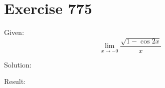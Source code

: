 \documentclass[a4paper, 10pt]{scrartcl}
\begin{document}
\section{Exercise 775}

Given:
\[
\lim_{x\to -0}{\frac{\sqrt{1 - \cos{2x}}}{x}}
\]

Solution:

Result:
\end{document}
